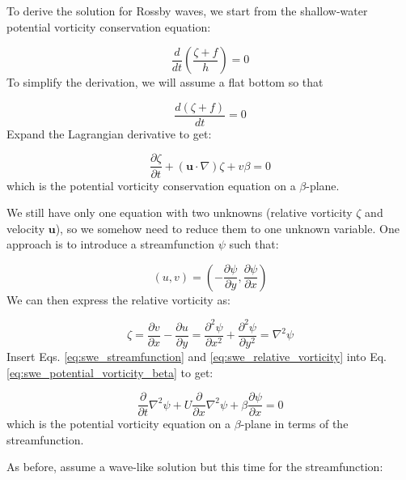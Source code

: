 \documentclass[12pt]{article}
\numberwithin{equation}{section}
\numberwithin{figure}{section}
\numberwithin{table}{section}
\begin{document}
To derive the solution for Rossby waves, we start from the shallow-water potential
vorticity conservation equation:

\begin{equation}
  \frac{d}{dt} \left( \frac{\zeta + f}{h} \right) = 0
\end{equation}
To simplify the derivation, we will assume a flat bottom so that

\begin{equation}
  \frac{d(\zeta + f)}{dt} = 0
\end{equation}
Expand the Lagrangian derivative to get:

\begin{equation}
  \frac{\partial \zeta}{\partial t} + \left(\mathbf{u} \cdot \nabla \right) \zeta + v \beta = 0
  \label{eq:swe_potential_vorticity_beta}
\end{equation}
which is the potential vorticity conservation equation on a $\beta$-plane.

We still have only one equation with two unknowns (relative vorticity $\zeta$
and velocity $\mathbf{u}$), so we somehow need to reduce them to one unknown
variable.
One approach is to introduce a streamfunction $\psi$ such that:

\begin{equation}
  (u, v) = \left( - \frac{\partial \psi}{\partial y}, \frac{\partial \psi}{\partial x} \right)
  \label{eq:swe_streamfunction}
\end{equation}
We can then express the relative vorticity as:

\begin{equation}
  \zeta = \frac{\partial v}{\partial x} - \frac{\partial u}{\partial y} =
  \frac{\partial^2 \psi}{\partial x^2} + \frac{\partial^2 \psi}{\partial y^2}
  = \nabla^2 \psi
  \label{eq:swe_relative_vorticity}
\end{equation}
Insert Eqs. \ref{eq:swe_streamfunction} and \ref{eq:swe_relative_vorticity}
into Eq. \ref{eq:swe_potential_vorticity_beta} to get:

\begin{equation}
  \frac{\partial}{\partial t} \nabla^2 \psi + U \frac{\partial}{\partial x} \nabla^2 \psi + \beta \frac{\partial \psi}{\partial x} = 0
  \label{eq:swe_streamfunction_beta}
\end{equation}
which is the potential vorticity equation on a $\beta$-plane in terms of the
streamfunction.

As before, assume a wave-like solution but this time for the streamfunction:
\end{document}
